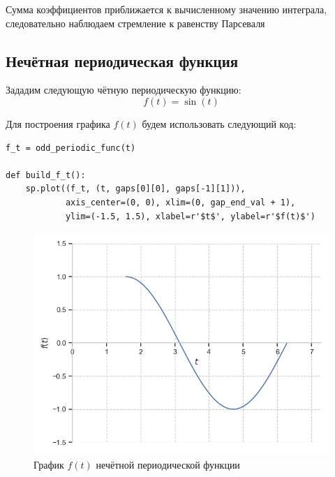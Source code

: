 \documentclass[a4paper, 16pt]{article}
\begin{document}
\noindent Сумма коэффициентов приближается к вычисленному значению интеграла,
следовательно наблюдаем стремление к равенству Парсеваля


\newpage
\subsection{Нечётная периодическая функция}
Зададим следующую чётную периодическую функцию:
$$f(t)=\sin(t)$$


\noindent Для построения графика $f(t)$ будем использовать следующий код:
\begin{lstlisting}[belowskip=-3mm]
    f_t = odd_periodic_func(t)

def build_f_t():
    sp.plot((f_t, (t, gaps[0][0], gaps[-1][1])), 
            axis_center=(0, 0), xlim=(0, gap_end_val + 1), 
            ylim=(-1.5, 1.5), xlabel=r'$t$', ylabel=r'$f(t)$')
\end{lstlisting}
\begin{figure}[!htb]
    \centering
    \includegraphics[scale=0.8]{odd_f(t).png}
    \captionsetup{skip=0pt}
    \caption{График $f(t)$ нечётной периодической функции}
    \label{Рис:23}
\end{figure}
\end{document}
